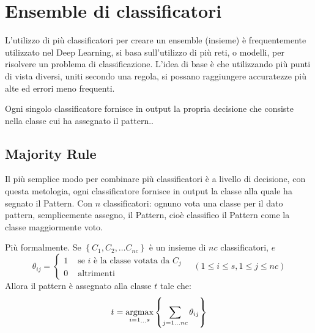 \chapter{Ensemble di classificatori}\label{ensemble-di-classificatori}

L'utilizzo di più classificatori per creare un ensemble (insieme) è frequentemente utilizzato nel Deep Learning, si basa sull’utilizzo di più
reti, o modelli, per risolvere un problema di classificazione. L’idea di base è che utilizzando più punti di vista diversi, uniti secondo una regola, si possano raggiungere accuratezze
più alte ed errori meno frequenti.

Ogni singolo classificatore fornisce in output la propria decisione che consiste nella classe cui
ha assegnato il pattern.\cite{unibo_maltoni_ml}\cite{zhi_enseble}. 

\section{Majority Rule}\label{majority-rule}

Il più semplice modo per combinare più classificatori è a livello
di decisione, con questa metologia, ogni classificatore fornisce in output la classe alla quale ha segnato il Pattern.  Con \(n\) classificatori: ognuno vota una classe per il dato
pattern, semplicemente assegno, il Pattern, cioè classifico il Pattern come la classe maggiormente voto.

Più formalmente.
Se \( \left\{C_{1}, C_{2}, \ldots C_{n c}\right\} \) è un insieme di \( n c \) classificatori, \( e \)
\[
\theta_{i j}=\left\{\begin{array}{cc}
1 & \text { se } i \text { è la classe votata da } C_{j} \\
0 & \text { altrimenti }
\end{array} \quad(1 \leq i \leq s, 1 \leq j \leq n c)\right.
\]
Allora il pattern è assegnato alla classe \( t \) tale che:
\[
t=\operatornamewithlimits{argmax} _{i=1_{\ldots} s}\left\{\sum_{j=1 \ldots n c} \theta_{i j}\right\}
\]